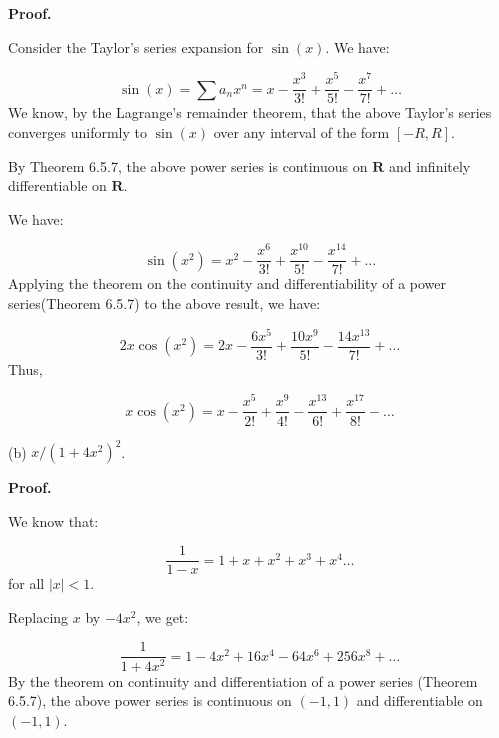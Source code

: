 \documentclass[10pt]{article}
\begin{document}
\textbf{Proof.}



Consider the Taylor's series expansion for $\displaystyle \sin( x)$. We have:


\begin{equation*}
\sin( x) =\sum a_{n} x^{n} =x-\frac{x^{3}}{3!} +\frac{x^{5}}{5!} -\frac{x^{7}}{7!} +\dotsc 
\end{equation*}
We know, by the Lagrange's remainder theorem, that the above Taylor's series converges uniformly to $\displaystyle \sin( x)$ over any interval of the form $\displaystyle [ -R,R]$. 



By Theorem 6.5.7, the above power series is continuous on $\displaystyle \mathbf{R}$ and infinitely differentiable on $\displaystyle \mathbf{R}$.



We have:


\begin{equation*}
\sin\left( x^{2}\right) =x^{2} -\frac{x^{6}}{3!} +\frac{x^{10}}{5!} -\frac{x^{14}}{7!} +\dotsc 
\end{equation*}
Applying the theorem on the continuity and differentiability of a power series(Theorem 6.5.7) to the above result, we have:


\begin{equation*}
2x\cos\left( x^{2}\right) =2x-\frac{6x^{5}}{3!} +\frac{10x^{9}}{5!} -\frac{14x^{13}}{7!} +\dotsc 
\end{equation*}
Thus,


\begin{equation*}
x\cos\left( x^{2}\right) =x-\frac{x^{5}}{2!} +\frac{x^{9}}{4!} -\frac{x^{13}}{6!} +\frac{x^{17}}{8!} -\dotsc 
\end{equation*}


(b) $\displaystyle x/\left( 1+4x^{2}\right)^{2}$. 



\textbf{Proof.}



We know that:


\begin{equation*}
\frac{1}{1-x} =1+x+x^{2} +x^{3} +x^{4} \dotsc 
\end{equation*}
for all $\displaystyle |x|< 1$. 



Replacing $\displaystyle x$ by $\displaystyle -4x^{2}$, we get:


\begin{equation*}
\frac{1}{1+4x^{2}} =1-4x^{2} +16x^{4} -64x^{6} +256x^{8} +\dotsc 
\end{equation*}
By the theorem on continuity and differentiation of a power series (Theorem 6.5.7), the above power series is continuous on $\displaystyle ( -1,1)$ and differentiable on $\displaystyle ( -1,1)$. 
\end{document}
